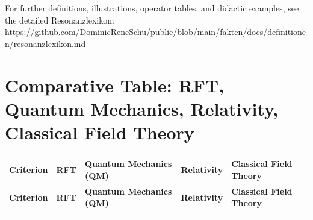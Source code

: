 \documentclass[12pt]{article}
\begin{document}
\noindent
For further definitions, illustrations, operator tables, and didactic examples, see the detailed Resonanzlexikon:\\
\url{https://github.com/DominicReneSchu/public/blob/main/fakten/docs/definitionen/resonanzlexikon.md}
\newpage

\section*{Comparative Table: RFT, Quantum Mechanics, Relativity, Classical Field Theory}

\renewcommand{\arraystretch}{1.3}
\begin{center}
	\begin{longtable}{|p{4cm}|p{3cm}|p{3cm}|p{3cm}|p{3cm}|}
		\hline
		\textbf{Criterion} & \textbf{RFT} & \textbf{Quantum Mechanics (QM)} & \textbf{Relativity} & \textbf{Classical Field Theory} \\
		\hline
		\endfirsthead
		
		\hline
		\textbf{Criterion} & \textbf{RFT} & \textbf{Quantum Mechanics (QM)} & \textbf{Relativity} & \textbf{Classical Field Theory} \\
		\hline
		\endhead
		
		\hline
		\endfoot
		
		\hline
		\endlastfoot
		

\end{longtable}
\end{center}
\end{document}
